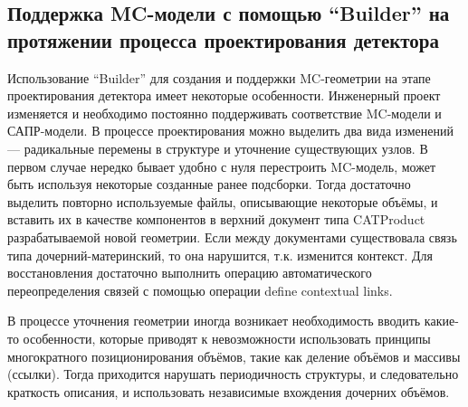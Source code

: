 
\subsection{Поддержка MC-модели с помощью ``Builder'' на протяжении процесса проектирования детектора}\label{sec:DesignProcess}

Использование ``Builder'' для создания и поддержки MC-геометрии на этапе проектирования детектора имеет некоторые особенности. Инженерный проект изменяется и необходимо постоянно поддерживать соответствие MC-модели и САПР-модели. В процессе проектирования можно выделить два вида изменений --- радикальные перемены в структуре и уточнение существующих узлов. В первом случае нередко бывает удобно с нуля перестроить MC-модель, может быть используя некоторые созданные ранее подсборки. Тогда достаточно выделить повторно используемые файлы, описывающие некоторые объёмы, и вставить их в качестве компонентов в верхний документ типа CATProduct разрабатываемой новой геометрии. Если между документами существовала связь типа дочерний-материнский, то она нарушится, т.к. изменится контекст. Для восстановления достаточно выполнить операцию автоматического переопределения связей с помощью операции define contextual links.

В процессе уточнения геометрии иногда возникает необходимость вводить какие-то особенности, которые приводят к невозможности использовать принципы многократного позиционирования объёмов, такие как деление объёмов и массивы (\todo ссылки). Тогда приходится нарушать периодичность структуры, и следовательно краткость описания, и использовать независимые вхождения дочерних объёмов. 

